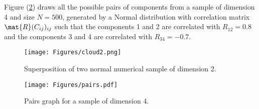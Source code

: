              Figure (\ref{cloud2}) draws all the possible pairs of components from a sample of dimension 4 and size $N=500$, generated by a Normal distribution with correlation matrix $\mat{R} (C_{ij})_{ij}$ such that the components 1 and 2 are correlated with $R_{12} = 0.8$ and the components 3 and 4 are correlated with $R_{34} = -0.7$.

             \begin{figure}[H]
               \begin{center}
                 \texttt{[image: Figures/cloud2.png]}
               \end{center}
               \caption{Superposition of two normal numerical sample of dimension 2.}
               \label{cloud2}
             \end{figure}


             \begin{figure}[H]
               \begin{center}
                 \texttt{[image: Figures/pairs.pdf]}
               \end{center}
               \caption{Pairs graph for a sample of dimension 4.}
               \label{cloud2}
             \end{figure}
